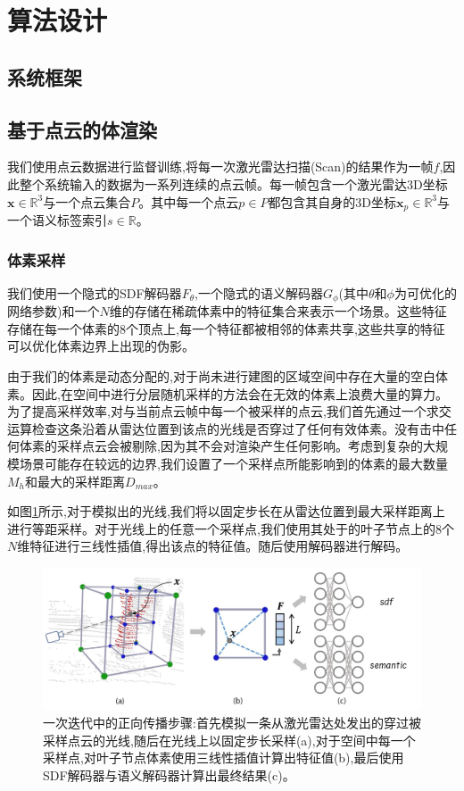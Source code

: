 \section{算法设计}\label{algorithm}

\subsection{系统框架}
\subsection{基于点云的体渲染}
我们使用点云数据进行监督训练,将每一次激光雷达扫描(Scan)的结果作为一帧$f$,因此整个系统输入的数据为一系列连续的点云帧。每一帧包含一个激光雷达3D坐标$\mathbf{x}\in \mathbb{R}^3 $与一个点云集合$P$。其中每一个点云$p\in P$都包含其自身的3D坐标$\mathbf{x}_p\in \mathbb{R}^3$与一个语义标签索引$s\in \mathbb{R}$。
\subsubsection{体素采样}
我们使用一个隐式的SDF解码器$F_\theta$,一个隐式的语义解码器$G_\phi$(其中$\theta$和$\phi$为可优化的网络参数)和一个$N$维的存储在稀疏体素中的特征集合来表示一个场景。这些特征存储在每一个体素的8个顶点上,每一个特征都被相邻的体素共享,这些共享的特征可以优化体素边界上出现的伪影。

由于我们的体素是动态分配的,对于尚未进行建图的区域空间中存在大量的空白体素。因此,在空间中进行分层随机采样的方法会在无效的体素上浪费大量的算力。为了提高采样效率,对与当前点云帧中每一个被采样的点云,我们首先通过一个求交运算检查这条沿着从雷达位置到该点的光线是否穿过了任何有效体素。没有击中任何体素的采样点云会被剔除,因为其不会对渲染产生任何影响。考虑到复杂的大规模场景可能存在较远的边界,我们设置了一个采样点所能影响到的体素的最大数量$M_h$和最大的采样距离$D_{max}$。

如图\ref{shinemapping}所示,对于模拟出的光线,我们将以固定步长在从雷达位置到最大采样距离上进行等距采样。对于光线上的任意一个采样点,我们使用其处于的叶子节点上的8个$N$维特征进行三线性插值,得出该点的特征值。随后使用解码器进行解码。
\begin{figure}[htbp]
    \includegraphics[scale = 0.3]{figures/shinemapping.png}
    \centering
    \caption{一次迭代中的正向传播步骤:首先模拟一条从激光雷达处发出的穿过被采样点云的光线,随后在光线上以固定步长采样(a),对于空间中每一个采样点,对叶子节点体素使用三线性插值计算出特征值(b),最后使用SDF解码器与语义解码器计算出最终结果(c)。}\label{shinemapping}
\end{figure}
